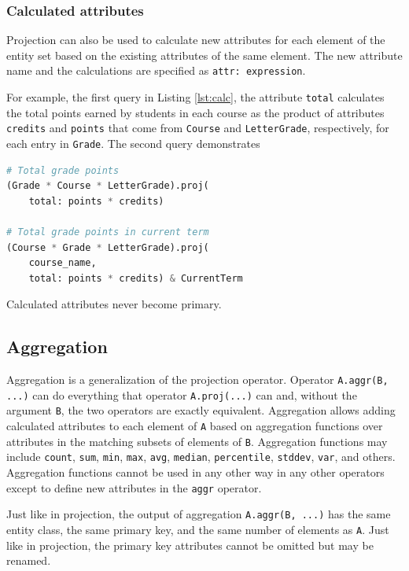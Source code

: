 \documentclass[letter,10pt]{article}
\begin{document}
\subsubsection{Calculated attributes}
Projection can also be used to calculate new attributes for each element of the entity set based on the existing attributes of the same element.
The new attribute name and the calculations are specified as  \lstinline$attr: expression$.
 
For example, the first query in Listing \ref{lst:calc}, the attribute \lstinline$total$ calculates the total points earned by students in each course as the product of attributes \lstinline$credits$ and \lstinline$points$ that come from \lstinline$Course$ and \lstinline$LetterGrade$, respectively, for each entry in \lstinline$Grade$.
The second query demonstrates 
\begin{lstlisting}[language=Python, caption={Extension: calculated attributes.}, label={lst:calc}]
# Total grade points
(Grade * Course * LetterGrade).proj(
    total: points * credits)

# Total grade points in current term
(Course * Grade * LetterGrade).proj(
    course_name, 
    total: points * credits) & CurrentTerm
\end{lstlisting}
Calculated attributes never become primary.

\subsection{Aggregation}\label{sec:aggr}
Aggregation is a generalization of the projection operator. 
Operator \lstinline$A.aggr(B, ...)$ can do everything that operator \lstinline$A.proj(...)$ can and, without the argument \lstinline$B$, the two operators are exactly equivalent.
Aggregation allows adding calculated attributes to each element of \lstinline$A$ based on aggregation functions over attributes in the matching  subsets of elements of \lstinline$B$.
Aggregation functions may include \lstinline$count$, \lstinline$sum$, \lstinline$min$, \lstinline$max$, \lstinline$avg$, \lstinline$median$, \lstinline$percentile$, \lstinline$stddev$, \lstinline$var$, and others. 
Aggregation functions cannot be used in any other way in any other operators except to define new attributes in the \lstinline$aggr$ operator.

Just like in projection, the output of aggregation \lstinline$A.aggr(B, ...)$ has the same entity class, the same primary key, and the same number of elements as \lstinline$A$.
Just like in projection, the primary key attributes cannot be omitted but may be renamed. 
\end{document}
